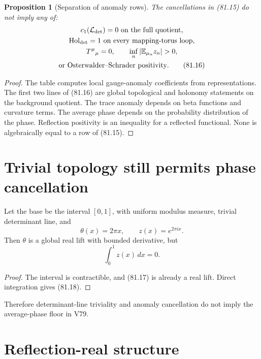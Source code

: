 \documentclass[11pt]{article}
\newtheorem{proposition}[theorem]{Proposition}
\theoremstyle{remark}
\begin{document}
\begin{proposition}[Separation of anomaly rows]
\label{prop:v15v81-separation}
The cancellations in (81.15) do not imply any of:
\[
\begin{gathered}
 c_1({\cal L}_{\rm det})=0\hbox{ on the full quotient},\\
 {\rm Hol}_{\rm det}=1\hbox{ on every mapping-torus loop},\\
 T^\mu{}_\mu=0,\qquad
 \inf_n|\mathbb E_{\mu_n}z_n|>0,\\
 \hbox{or Osterwalder--Schrader positivity}.           \tag{81.16}
\end{gathered}
\]
\end{proposition}

\begin{proof}
The table computes local gauge-anomaly coefficients from
representations.  The first two lines of (81.16) are global
topological and holonomy statements on the background quotient.
The trace anomaly depends on beta functions and curvature terms.
The average phase depends on the probability distribution of the
phase.  Reflection positivity is an inequality for a reflected
functional.  None is algebraically equal to a row of (81.15).
\end{proof}

\section{Trivial topology still permits phase cancellation}

\begin{counterexample}
\label{cnt:v15v81-average}
Let the base be the interval \([0,1]\), with uniform modulus
measure, trivial determinant line, and
\[
 \theta(x)=2\pi x,\qquad z(x)=e^{2\pi ix}.             \tag{81.17}
\]
Then \(\theta\) is a global real lift with bounded derivative, but
\[
 \int_0^1z(x)\,dx=0.                                  \tag{81.18}
\]
\end{counterexample}

\begin{proof}
The interval is contractible, and (81.17) is already a real lift.
Direct integration gives (81.18).
\end{proof}

Therefore determinant-line triviality and anomaly cancellation do
not imply the average-phase floor in V79.

\section{Reflection-real structure}
\end{document}
